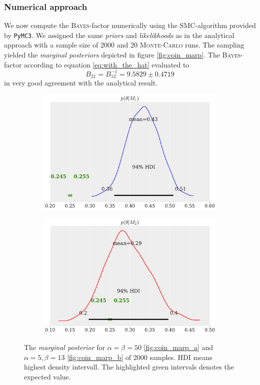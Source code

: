 \documentclass[%
 reprint,
 amsmath,amssymb,
 aps,
]{revtex4-1}
\begin{document}
\subsubsection{\textbf{Numerical approach}}
\noindent We now compute the \textsc{Bayes}-factor numerically using the SMC-algorithm provided by \texttt{PyMC3}. We assigned the same \emph{priors} and \emph{likelikhoods} as in the analytical approach with a sample size of 2000 and 20 \textsc{Monte-Carlo} runs. The sampling yielded the \emph{marginal posteriors} depicted in figure \eqref{fig:coin_marp}. 
The \textsc{Bayes}-factor according to equation \eqref{eq:with_the_hat} evaluated to
$$B_{21}=B_{12}^{-1}=9.5829\pm0.4719$$
in very good agreement with the analytical result.
\begin{figure}[htbp]
	\begin{subfigure}{\linewidth}
		\includegraphics[width=0.9\linewidth]{coin_marp_m1.pdf}
		\subcaption{}\label{fig:coin_marp_a}
	\end{subfigure}
	\begin{subfigure}{\linewidth}
		\includegraphics[width=0.9\linewidth]{coin_marp_m2.pdf}
		\subcaption{}\label{fig:coin_marp_b}
	\end{subfigure}
	\caption{The \emph{marginal posterior} for $\alpha=\beta=50$ \eqref{fig:coin_marp_a} and $\alpha=5, \beta=13$ \eqref{fig:coin_marp_b} of 2000 samples. HDI means highest density intervall. The highlighted green intervals denotes the expected value.}\label{fig:coin_marp}
\end{figure}
\end{document}
